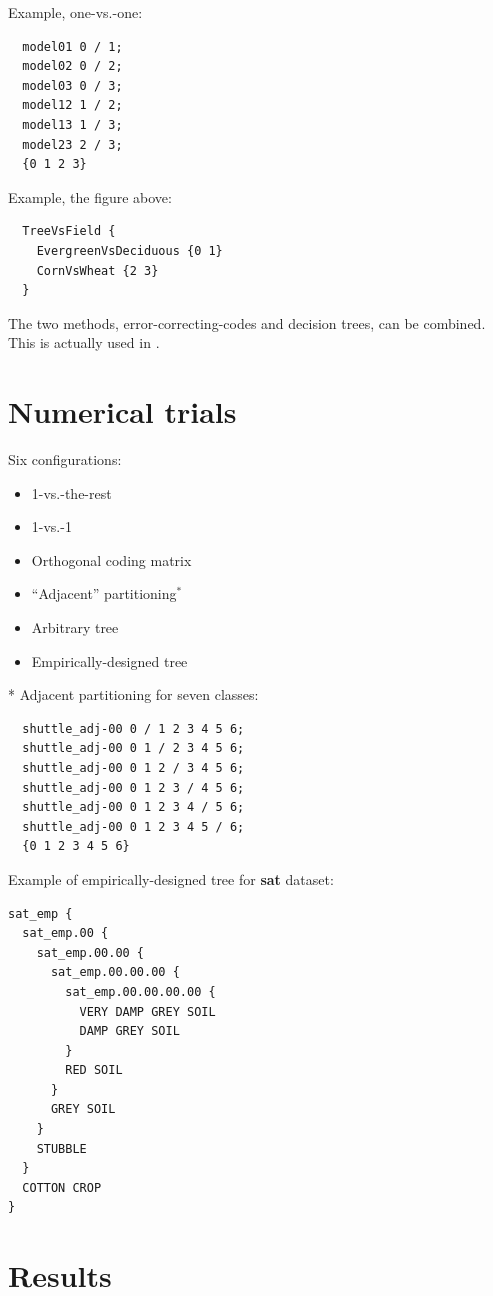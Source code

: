 \documentclass[a0,landscape]{a0poster}
\begin{document}
\begin{multicols}{4}
Example, one-vs.-one:

\begin{verbatim}
  model01 0 / 1;
  model02 0 / 2;
  model03 0 / 3;
  model12 1 / 2;
  model13 1 / 3;
  model23 2 / 3;
  {0 1 2 3}
\end{verbatim}

Example, the figure above:

\begin{verbatim}
  TreeVsField {
    EvergreenVsDeciduous {0 1}
    CornVsWheat {2 3}
  }
\end{verbatim}

The two methods, error-correcting-codes and decision trees, can be combined.
This is actually used in \citet{Zhou_etal2019}.

\section*{Numerical trials}

Six configurations:
\begin{itemize}
	\item 1-vs.-the-rest
	\item 1-vs.-1
	\item Orthogonal coding matrix \citep{Mills2017}
	\item ``Adjacent'' partitioning$^*$
	\item Arbitrary tree
	\item Empirically-designed tree
\end{itemize}

* Adjacent partitioning for seven classes:
\begin{verbatim}
  shuttle_adj-00 0 / 1 2 3 4 5 6;
  shuttle_adj-00 0 1 / 2 3 4 5 6;
  shuttle_adj-00 0 1 2 / 3 4 5 6;
  shuttle_adj-00 0 1 2 3 / 4 5 6;
  shuttle_adj-00 0 1 2 3 4 / 5 6;
  shuttle_adj-00 0 1 2 3 4 5 / 6;
  {0 1 2 3 4 5 6}
\end{verbatim}

Example of empirically-designed tree
for {\bf sat} dataset:
\begin{verbatim}
sat_emp {
  sat_emp.00 {
    sat_emp.00.00 {
      sat_emp.00.00.00 {
        sat_emp.00.00.00.00 {
          VERY DAMP GREY SOIL
          DAMP GREY SOIL
        }
        RED SOIL
      }
      GREY SOIL
    }
    STUBBLE
  }
  COTTON CROP
}
\end{verbatim}

\section*{Results}


\end{multicols}
\end{document}
